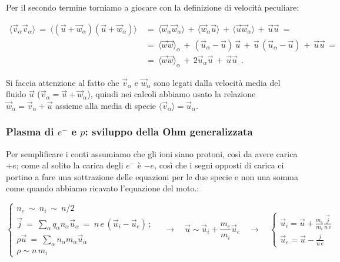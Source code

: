 Per il secondo termine torniamo a giocare con la definizione di velocità peculiare:

\[ \begin{aligned} \langle \vec v_\alpha \vec v_\alpha\rangle\ =\ \langle (\vec u + \vec w_\alpha)(\vec u + \vec w_\alpha) \rangle\ &=\ \langle \vec w_\alpha \vec w_\alpha\rangle\, +\, \langle \vec w_\alpha \vec u\rangle\, +\, \langle \vec u \vec w_\alpha\rangle \, +\, \vec u\vec u\ =\\ &=\ \langle \vec w \vec w\rangle_\alpha \,+\, (\vec u_\alpha - \vec u)\, \vec u \, +\, \vec u\, (\vec u_\alpha - \vec u)\, +\, \vec u\vec u\ =\\
	&=\ \langle \vec w \vec w\rangle_\alpha\, +\, 2\vec u_\alpha \vec u\, +\, \vec u \vec u\ \ .
\end{aligned}\]

Si faccia attenzione al fatto che $\vec v_\alpha$ e $\vec w_\alpha$ sono legati dalla velocità media del fluido $\vec u$ ($\vec v_\alpha = \vec u + \vec w_\alpha$), quindi nei calcoli abbiamo usato la relazione $\vec w_\alpha = \vec v_\alpha + \vec u$ assieme alla media di specie $\langle \vec v_\alpha\rangle =\vec u_\alpha$. 


\subsubsection{Plasma di $e^-$ e $p$: sviluppo della Ohm generalizzata}
Per semplificare i conti assumiamo che gli ioni siano protoni, così da avere carica $+e$; come al solito la carica degli $e^-$ è $-e$, così che i segni opposti di carica ci portino a fare una sottrazione delle equazioni per le due specie e non una somma come quando abbiamo ricavato l'equazione del moto.:

\[\begin{cases}
	n_e\ \sim\ n_i\ \sim\ n / 2\\
	\vec j\ =\ \sum_\alpha q_\alpha n_\alpha \vec u_\alpha\ =\ n\,e\, (\vec u_i-\vec u_e)\, ;\\
	\rho \vec u\ =\ \sum_\alpha n_\alpha m_\alpha \vec u_\alpha\\
	\rho \sim n\, m_i
\end{cases}
\quad \rightarrow \quad
\vec u \sim \vec u_i + \frac{m_e}{m_i} \vec u_e
 \quad \rightarrow \quad
\begin{cases}
	\vec u_i = \vec u +\frac{m_e}{m_i} \frac{\vec j}{n\, e}\\
	\vec u_e = \vec u - \frac{j}{n\, e}
\end{cases}\]

